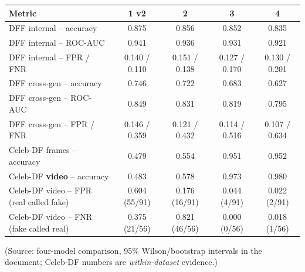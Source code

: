 \documentclass[11pt,a4paper]{report}
\begin{document}
\begin{center}
\footnotesize\setlength{\tabcolsep}{4pt}
\begin{tabular}{|l|c|c|c|c|}
\hline
\textbf{Metric} & \textbf{1 v2} & \textbf{2} & \textbf{3} & \textbf{4}\\\hline
DFF internal -- accuracy & 0.875 & 0.856 & 0.852 & 0.835\\\hline
DFF internal -- ROC-AUC & 0.941 & 0.936 & 0.931 & 0.921\\\hline
DFF internal -- FPR / FNR & 0.140 / 0.110 & 0.151 / 0.138 & 0.127 / 0.170 & 0.130 / 0.201\\\hline
DFF cross-gen -- accuracy & 0.746 & 0.722 & 0.683 & 0.627\\\hline
DFF cross-gen -- ROC-AUC & 0.849 & 0.831 & 0.819 & 0.795\\\hline
DFF cross-gen -- FPR / FNR & 0.146 / 0.359 & 0.121 / 0.432 & 0.114 / 0.516 & 0.107 / 0.634\\\hline
Celeb-DF frames -- accuracy & 0.479 & 0.554 & 0.951 & 0.952\\\hline
Celeb-DF \textbf{video} -- accuracy & 0.483 & 0.578 & 0.973 & 0.980\\\hline
Celeb-DF video -- FPR (real called fake) & 0.604 (55/91) & 0.176 (16/91) & 0.044 (4/91) & 0.022 (2/91)\\\hline
Celeb-DF video -- FNR (fake called real) & 0.375 (21/56) & 0.821 (46/56) & 0.000 (0/56) & 0.018 (1/56)\\\hline
\end{tabular}
\end{center}
(Source: four-model comparison, 95\% Wilson/bootstrap intervals in the document; Celeb-DF numbers are \emph{within-dataset} evidence.)
\end{document}

